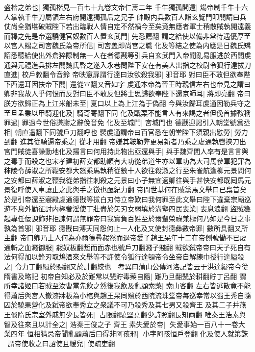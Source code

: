 盛楷之弟也|{
	獨孤楷見一百七十九卷文帝仁夀二年}
千牛獨孤開遠|{
	煬帝制千牛十六人掌執千牛刀屬領左右府開遠獨孤后之兄子}
帥殿内兵數百人詣玄覽門叩閤請曰兵仗尚全猶堪破賊陛下若出臨戰人情自定不然禍今至矣竟無應者軍士稍散賊執開遠義而釋之先是帝選驍健官奴數百人置玄武門|{
	先悉薦翻}
謂之給使以備非常待遇優厚至以宮人賜之司宮魏氏為帝所信|{
	司宮盖即尚宮之職}
化及等結之使為内應是日魏氏矯詔悉聽給使出外倉猝際制無一人在者德戡等引兵自玄武門入帝聞亂易服逃於西閤䖍通與元禮進兵排左閤魏氏啓之遂入永巷問陛下安在有美人出指之校尉令狐行達拔刀直進|{
	校戶教翻令音鈴}
帝映窻扉謂行達曰汝欲殺我邪|{
	邪音耶}
對曰臣不敢但欲奉陛下西還耳因扶帝下閤|{
	還從宣翻又音如字}
䖍通本帝為晉王時親信左右也帝見之謂曰卿非我故人乎何恨而反對曰臣不敢反但將士思歸欲奉陛下還京師耳|{
	將即亮翻}
帝曰朕方欲歸正為上江米船未至|{
	夏口以上為上江為于偽翻}
今與汝歸耳䖍通因勒兵守之至旦孟秉以甲騎迎化及|{
	騎奇寄翻下同}
化及戰栗不能言人有來謁之者但俛首據鞍稱罪過|{
	罪過今世俗謙謝之辭俛音免}
化及至城門|{
	宮城門也}
德戡迎謁引入朝堂號爲丞相|{
	朝直遥翻下同號戶刀翻呼也}
裴䖍通謂帝曰百官悉在朝堂陛下須親出慰勞|{
	勞力到翻}
進其從騎逼帝乘之|{
	從才用翻}
帝嫌其鞍勒弊更易新者乃乘之䖍通執轡挾刀出宮門賊徒喜譟動地化及揚言曰何用持此物出亟還與手|{
	與手魏齊間人率有是言言與之毒手而殺之也宋孝建初薛安都助順有大功從弟道生亦以軍功為大司馬參軍犯罪為秣陵令薛淑之所鞭安都大怒乘馬執稍從數十人欲往殺淑之行至朱雀航逢柳元景問何之安都曰薛淑之鞭我從弟指往刺殺之元景曰小子無宜適卿往與手甚快安都既囘馬元景復呼使入車讓止之此與手之徵也亟紀力翻}
帝問世基何在賊黨馬文舉曰已梟首矣於是引帝還至寢殿䖍通德戡等拔白刃侍立帝歎曰我何罪至此文舉曰陛下違棄宗廟巡遊不息外勤征討内極奢淫使丁壯盡於矢刃女弱填於溝壑四民喪業|{
	喪息浪翻}
盜賊蠭起專任佞諛飾非拒諫何謂無罪帝曰我實負百姓至於爾輩榮祿兼極何乃如是今日之事孰為首邪|{
	邪音耶}
德戡曰溥天同怨何止一人化及又使封德彝數帝罪|{
	數所具翻又所主翻}
帝曰卿乃士人何為亦爾德彞赧然而退帝愛子趙王杲年十二在帝側號慟不已䖍通斬之血濺御服|{
	赧奴板翻慙而面赤也號戶刀翻濺子賤翻}
賊欲弑帝帝曰天子死自有法何得加以鋒刃取鴆酒來文舉等不許使令狐行達頓帝令坐帝自解練巾授行達縊殺之|{
	令力丁翻縊於賜翻又於計翻絞也　考異曰蒲山公傳河洛記皆云于洪達縊帝今從隋書及略記}
初帝自知必及於難常以甖貯毒藥自隨|{
	難乃旦翻甖於耕翻貯丁呂翻}
謂所幸諸姬曰若賊至汝曹當先飲之然後我飲及亂顧索藥|{
	索山客翻}
左右皆逃散竟不能得蕭后與宮人撤漆牀板為小棺與趙王杲同殯於西院流珠堂帝每巡幸常以蜀王秀自隨囚於驍果營化及弑帝欲奉秀立之衆議不可乃殺秀及其七男又殺齊王及其二子并燕王倓隋氏宗室外戚無少長皆死|{
	古限翻驍堅堯翻少詩照翻長知兩翻}
唯秦王浩素與智及往來且以計全之|{
	浩秦王俊之子}
齊王素失愛於帝|{
	失愛事始一百八十一卷大業四年}
恒相猜忌帝聞亂顧蕭后曰得非阿孩邪|{
	小字阿孩恒戶登翻}
化及使人就第誅謂帝使收之曰詔使且緩兒|{
	使疏吏翻}
